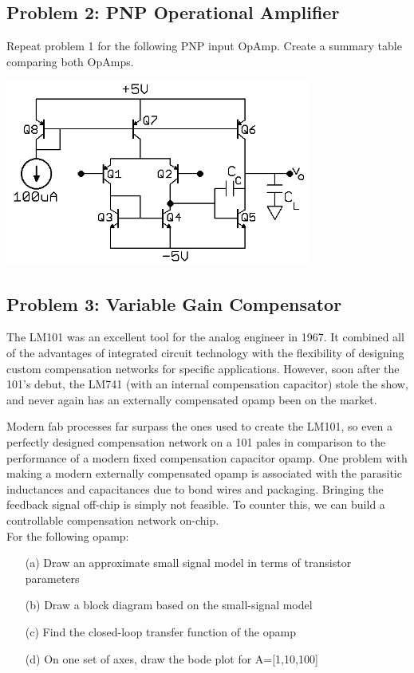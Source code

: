 \documentclass[11pt,twoside]{article}
\begin{document}
\subsection*{Problem 2: PNP Operational Amplifier}
Repeat problem 1 for the following PNP input OpAmp.  Create a summary table comparing both OpAmps.

\begin{center}
\includegraphics[width=0.75\textwidth]{pnp-op.png}
\end{center}

\subsection*{Problem 3: Variable Gain Compensator}
The LM101 was an excellent tool for the analog engineer in 1967.
It combined all of the advantages of integrated circuit technology with the flexibility of designing custom compensation networks for specific applications.
However, soon after the 101's debut, the LM741 (with an internal compensation capacitor) stole the show, and never again has an externally compensated opamp been on the market.

Modern fab processes far surpass the ones used to create the LM101, so even a perfectly designed compensation network on a 101 pales in comparison to the performance of a modern fixed compensation capacitor opamp.
One problem with making a modern externally compensated opamp is associated with the parasitic inductances and capacitances due to bond wires and packaging.
Bringing the feedback signal off-chip is simply not feasible.
To counter this, we can build a controllable compensation network on-chip.\\

For the following opamp:
\begin{enumerate}
	\item[(a)] Draw an approximate small signal model in terms of transistor parameters
	\item[(b)] Draw a block diagram based on the small-signal model
	\item[(c)] Find the closed-loop transfer function of the opamp
	\item[(d)] On one set of axes, draw the bode plot for A=[1,10,100]
\end{enumerate}
\end{document}

